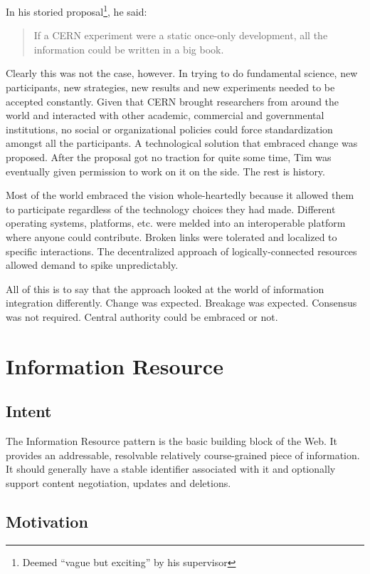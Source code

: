 In his storied proposal\footnote{Deemed ``vague but exciting'' by his supervisor}, he said:

\begin{quote}
If a CERN experiment were a static once-only development, all the information could be written in a big book.\citet{bernerslee89}
\end{quote}

Clearly this was not the case, however. In trying to do fundamental science, new participants, new strategies, new results and new experiments needed to be accepted constantly. Given that CERN brought researchers from around the world and interacted with other academic, commercial and governmental institutions, no social or organizational policies could force standardization amongst all the participants. A technological solution that embraced change was proposed. After the proposal got no traction for quite some time, Tim was eventually given permission to work on it on the side. The rest is history.

Most of the world embraced the vision whole-heartedly because it allowed them to participate regardless of the technology choices they had made. Different operating systems, platforms, etc. were melded into an interoperable platform where anyone could contribute. Broken links were tolerated and localized to specific interactions. The decentralized approach of logically-connected resources allowed demand to spike unpredictably.

All of this is to say that the approach looked at the world of information integration differently. Change was expected. Breakage was expected. Consensus was not required. Central authority could be embraced or not.

\newpage
\section{Information Resource}
\label{ch01.sec.2}

\subsection{Intent}
\label{ch01.sec.2.intent}
The Information Resource pattern is the basic building block of the Web. It provides an addressable, resolvable relatively course-grained piece of information. It should generally have a stable identifier associated with it and optionally support content negotiation, updates and deletions.

\subsection{Motivation}
\label{ch01.sec.2.motivation}


